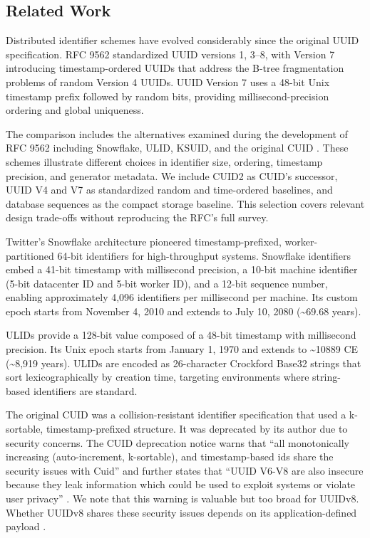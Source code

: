 \documentclass[a4paper,fleqn]{cas-sc}
\begin{document}
\subsection{Related Work}\label{related-work}

Distributed identifier schemes have evolved considerably since the
original UUID specification. RFC 9562 \citep{rfc9562} standardized UUID
versions 1, 3--8, with Version 7 introducing timestamp-ordered UUIDs
that address the B-tree fragmentation problems of random Version 4
UUIDs. UUID Version 7 uses a 48-bit Unix timestamp prefix followed by
random bits, providing millisecond-precision ordering and global
uniqueness.

The comparison includes the alternatives examined during the development
of RFC 9562 including Snowflake, ULID, KSUID, and the original CUID
\citep[Section 2.1]{rfc9562}. These schemes illustrate different choices
in identifier size, ordering, timestamp precision, and generator
metadata. We include CUID2 as CUID's successor, UUID V4 and V7 as
standardized random and time-ordered baselines, and database sequences
as the compact storage baseline. This selection covers relevant design
trade-offs without reproducing the RFC's full survey.

Twitter's Snowflake architecture
\citep{snowflake, snowflake-announcement} pioneered timestamp-prefixed,
worker-partitioned 64-bit identifiers for high-throughput systems.
Snowflake identifiers embed a 41-bit timestamp with millisecond
precision, a 10-bit machine identifier (5-bit datacenter ID and 5-bit
worker ID), and a 12-bit sequence number, enabling approximately 4,096
identifiers per millisecond per machine. Its custom epoch starts from
November 4, 2010 and extends to July 10, 2080 (\textasciitilde69.68
years).

ULIDs \citep{ulid} provide a 128-bit value composed of a 48-bit
timestamp with millisecond precision. Its Unix epoch starts from January
1, 1970 and extends to \textasciitilde10889 CE (\textasciitilde8,919
years). ULIDs are encoded as 26-character Crockford Base32 strings that
sort lexicographically by creation time, targeting environments where
string-based identifiers are standard.

The original CUID \citep{cuid-deprecated} was a collision-resistant
identifier specification that used a k-sortable, timestamp-prefixed
structure. It was deprecated by its author due to security concerns. The
CUID deprecation notice warns that ``all monotonically increasing
(auto-increment, k-sortable), and timestamp-based ids share the security
issues with Cuid'' and further states that ``UUID V6-V8 are also
insecure because they leak information which could be used to exploit
systems or violate user privacy'' \citep{cuid-deprecated}. We note that
this warning is valuable but too broad for UUIDv8. Whether UUIDv8 shares
these security issues depends on its application-defined payload
\citep[Section 5.8]{rfc9562}.
\end{document}
